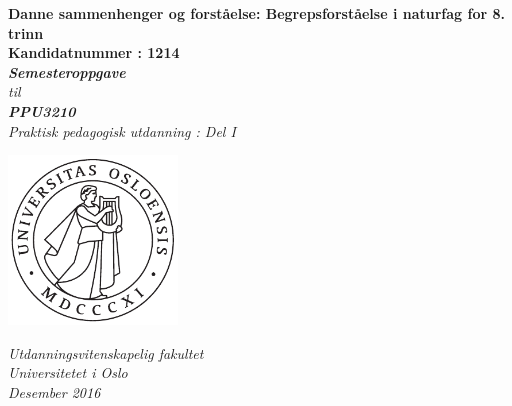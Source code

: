 \documentclass[main.tex]{subfiles}
\begin{document}
\thispagestyle{empty}
\begin{center}        %
  \vspace{5mm}        %
  \LARGE
  \textbf{Danne sammenhenger og forståelse: Begrepsforståelse i naturfag for 8. trinn} \\
  \Large
  \vspace{10mm}
  \large
  \textbf{Kandidatnummer : 1214} \\
  \vspace{20mm}
  \Large
  {\bf{\textsl{Semesteroppgave}}} \\
  \textsl{til} \\
  \vspace{2mm}
  {\bf{\textsl{PPU3210}}} \\
  \vspace{5mm}
  {\large \textsl {Praktisk pedagogisk utdanning : Del I}}\\
  \vspace{10mm}
  \centerline{\includegraphics[width=45mm,height=45mm]{../figures/uiosegl.pdf}} 
  \vspace{8mm}
  \textsl{Utdanningsvitenskapelig fakultet} \\
  \textsl{Universitetet i Oslo} \\
  \vspace{5mm}
  \large
  \textsl{Desember 2016} \\
  \vspace{2cm}


\end{center}
\end{document}

